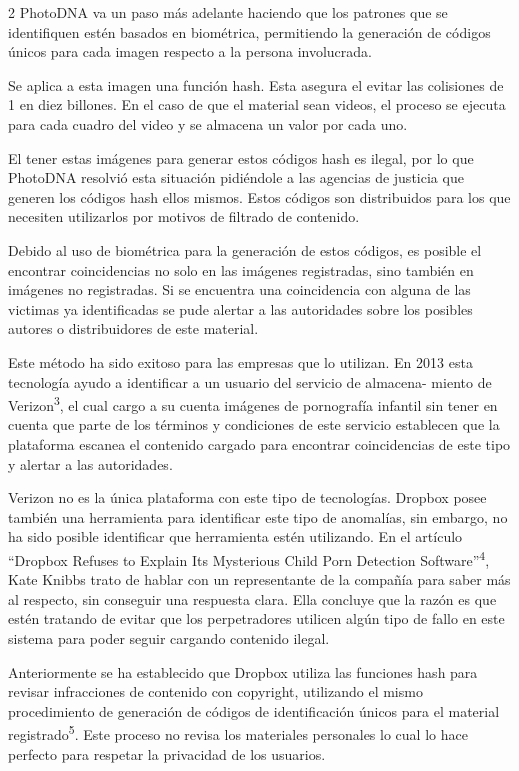 \documentclass[12pt,spanish,Letterpaper,openany]{book}
\begin{document}
\begin {multicols}{2}
PhotoDNA va un paso más adelante haciendo que los patrones que se identifiquen estén basados en biométrica, permitiendo la generación de códigos únicos para cada imagen respecto a la persona involucrada.

Se aplica a esta imagen una función hash. Esta asegura el evitar las colisiones de 1 en diez billones. En el caso de que el material sean videos, el proceso se ejecuta para cada cuadro del video y se almacena un valor por cada uno.

El tener estas imágenes para generar estos códigos hash es ilegal, por lo que PhotoDNA resolvió esta situación pidiéndole a las agencias de justicia que generen los códigos hash ellos mismos. Estos códigos son distribuidos para los que necesiten utilizarlos por motivos de filtrado de contenido.

Debido al uso de biométrica para la generación de estos códigos, es posible el encontrar coincidencias no solo en las imágenes registradas, sino también en imágenes no registradas. Si se encuentra una coincidencia con alguna de las victimas ya identificadas se pude alertar a las autoridades sobre los posibles autores o distribuidores de este material.

Este método ha sido exitoso para las empresas que lo utilizan. En 2013 esta tecnología ayudo a identificar a un usuario del servicio de almacena-
miento de Verizon\textsuperscript{3}, el cual cargo a su cuenta imágenes de pornografía infantil sin tener en cuenta que parte de los términos y condiciones de este servicio establecen que la plataforma escanea el contenido cargado para encontrar coincidencias de este tipo y alertar a las autoridades.

Verizon no es la única plataforma con este tipo de tecnologías. Dropbox posee también una herramienta para identificar este tipo de anomalías, sin embargo, no ha sido posible identificar que herramienta estén utilizando. En el artículo ``Dropbox Refuses to Explain Its Mysterious Child Porn Detection Software''\textsuperscript{4}, Kate Knibbs trato de hablar con un representante de la compañía para saber más al respecto, sin conseguir una respuesta clara. Ella concluye que la razón es que estén tratando de evitar que los perpetradores utilicen algún tipo de fallo en este sistema para poder seguir cargando contenido ilegal.

Anteriormente se ha establecido que Dropbox utiliza las funciones hash para revisar infracciones de contenido con copyright, utilizando el mismo procedimiento de generación de códigos de identificación únicos para el material registrado\textsuperscript{5}. Este proceso no revisa los materiales personales lo cual lo hace perfecto para respetar la privacidad de los usuarios.


\end{multicols}
\end{document}
